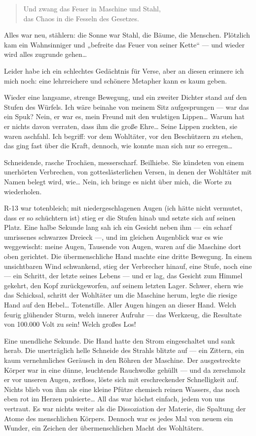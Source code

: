 \begin{verse}
Und zwang das Feuer in Maschine und Stahl,\\
das Chaos in die Fesseln des Gesetzes.
\end{verse}

Alles war neu, stählern: die Sonne war Stahl, die Bäume, die
Menschen. Plötzlich kam ein Wahnsinniger und „befreite das Feuer
von seiner Kette“ — und wieder wird alles zugrunde gehen\ldots{}

Leider habe ich ein schlechtes Gedächtnis für Verse, aber an diesen
erinnere ich mich noch: eine lehrreichere und schönere Metapher
kann es kaum geben.

Wieder eine langsame, strenge Bewegung, und ein
zweiter Dichter stand auf den Stufen des Würfels. Ich wäre beinahe
von meinem Sitz aufgesprungen — war das ein Spuk? Nein, er war es,
mein Freund mit den wulstigen Lippen\ldots{} Warum hat er nichts davon
verraten, dass ihm die große Ehre\ldots{} Seine Lippen zuckten, sie
waren aschfahl. Ich begriff: vor dem Wohltäter, vor den Beschützern
zu stehen, das ging fast über die Kraft, dennoch, wie konnte man
sich nur so erregen\ldots{}

Schneidende, rasche Trochäen, messerscharf. Beilhiebe. Sie kündeten
von einem unerhörten Verbrechen, von gotteslästerlichen Versen, in
denen der Wohltäter mit Namen belegt wird, wie\ldots{} Nein, ich bringe
es nicht über mich, die Worte zu wiederholen.

R-13 war totenbleich; mit niedergeschlagenen Augen (ich hätte nicht
vermutet, dass er so schüchtern ist) stieg er die Stufen hinab und
setzte sich auf seinen Platz. Eine halbe Sekunde lang sah ich ein
Gesicht neben ihm — ein scharf umrissenes schwarzes Dreieck —, und
im gleichen Augenblick war es wie weggewischt: meine Augen,
Tausende von Augen, waren auf die Maschine dort oben gerichtet. Die
übermenschliche Hand machte eine dritte Bewegung. In einem
unsichtbaren Wind schwankend, stieg der Verbrecher hinauf, eine
Stufe, noch eine — ein Schritt, der letzte seines Lebens — und er
lag, das Gesicht zum Himmel gekehrt, den Kopf zurückgeworfen, auf
seinem letzten Lager. Schwer, ehern wie das Schicksal, schritt der
Wohltäter um die Maschine herum, legte die riesige Hand auf den
Hebel\ldots{} Totenstille. Aller Augen hingen an dieser Hand. Welch
feurig glühender Sturm, welch
innerer Aufruhr — das Werkzeug, die Resultate von 100.000 Volt zu
sein! Welch großes Los!

Eine unendliche Sekunde. Die Hand hatte den
Strom eingeschaltet und sank herab. Die unerträglich helle Schneide
des Strahls blitzte auf — ein Zittern, ein kaum vernehmliches
Geräusch in den Röhren der Maschine. Der ausgestreckte Körper war
in eine dünne, leuchtende Rauchwolke gehüllt — und da zerschmolz er
vor unseren Augen, zerfloss, löste sich mit erschreckender
Schnelligkeit auf. Nichts blieb von ihm als eine kleine Pfütze
chemisch reinen Wassers, das noch eben rot im Herzen pulsierte\ldots{}
All das war höchst einfach, jedem von uns vertraut. Es war nichts
weiter als die Dissoziation der Materie, die Spaltung der Atome des
menschlichen Körpers. Dennoch war es jedes Mal von neuem ein
Wunder, ein Zeichen der übermenschlichen Macht des Wohltäters.

